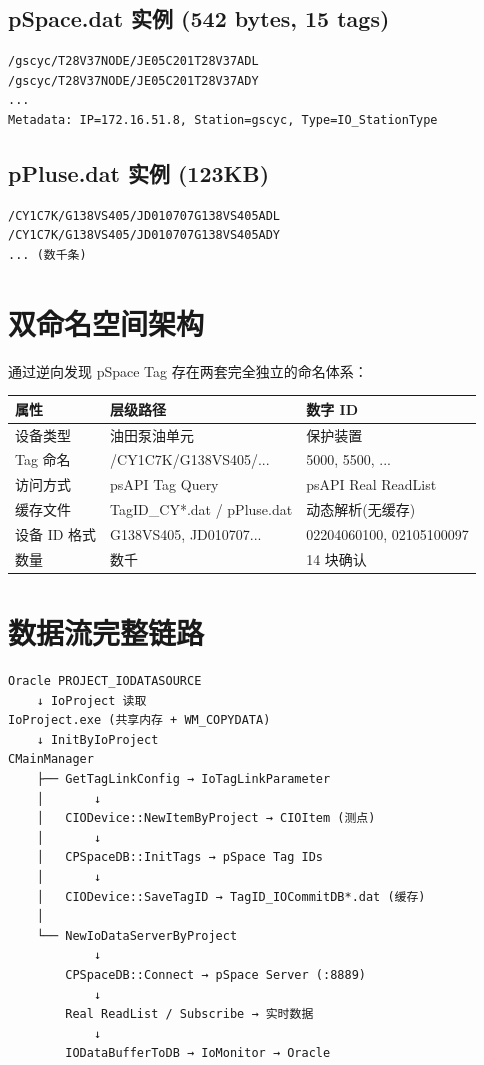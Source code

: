 \documentclass[12pt,a4paper]{ctexart}
\begin{document}
\subsection{pSpace.dat 实例 (542 bytes, 15 tags)}
\begin{verbatim}
/gscyc/T28V37NODE/JE05C201T28V37ADL
/gscyc/T28V37NODE/JE05C201T28V37ADY
...
Metadata: IP=172.16.51.8, Station=gscyc, Type=IO_StationType
\end{verbatim}

\subsection{pPluse.dat 实例 (123KB)}
\begin{verbatim}
/CY1C7K/G138VS405/JD010707G138VS405ADL
/CY1C7K/G138VS405/JD010707G138VS405ADY
... (数千条)
\end{verbatim}

\section{双命名空间架构}

通过逆向发现 pSpace Tag 存在两套完全独立的命名体系：

\begin{table}[H]\centering
\begin{tabular}{lll}
\toprule
\textbf{属性} & \textbf{层级路径} & \textbf{数字 ID} \\
\midrule
设备类型 & 油田泵油单元 & 保护装置 \\
Tag 命名 & /CY1C7K/G138VS405/... & 5000, 5500, ... \\
访问方式 & psAPI Tag Query & psAPI Real ReadList \\
缓存文件 & TagID\_CY*.dat / pPluse.dat & 动态解析(无缓存) \\
设备 ID 格式 & G138VS405, JD010707... & 02204060100, 02105100097 \\
数量 & 数千 & 14 块确认 \\
\bottomrule
\end{tabular}
\end{table}

\section{数据流完整链路}

\begin{verbatim}
Oracle PROJECT_IODATASOURCE
    ↓ IoProject 读取
IoProject.exe (共享内存 + WM_COPYDATA)
    ↓ InitByIoProject
CMainManager
    ├── GetTagLinkConfig → IoTagLinkParameter
    │       ↓
    │   CIODevice::NewItemByProject → CIOItem (测点)
    │       ↓
    │   CPSpaceDB::InitTags → pSpace Tag IDs
    │       ↓
    │   CIODevice::SaveTagID → TagID_IOCommitDB*.dat (缓存)
    │
    └── NewIoDataServerByProject
            ↓
        CPSpaceDB::Connect → pSpace Server (:8889)
            ↓
        Real ReadList / Subscribe → 实时数据
            ↓
        IODataBufferToDB → IoMonitor → Oracle
\end{verbatim}
\end{document}
